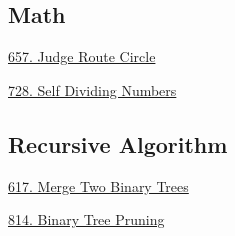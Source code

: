 \subsection*{Math}
\begin{flushleft}
\hyperref[algo:657]{657. Judge Route Circle}

\hyperref[algo:728]{728. Self Dividing Numbers}
\end{flushleft}

\subsection*{Recursive Algorithm}
\begin{flushleft}
    \hyperref[algo:617]{617. Merge Two Binary Trees}

    \hyperref[algo:814]{814. Binary Tree Pruning}
\end{flushleft}
